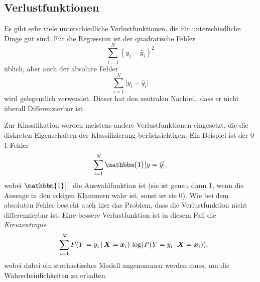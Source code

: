 		\subsection{Verlustfunktionen}
			Es gibt sehr viele unterschiedliche Verlustfunktionen, die für unterschiedliche Dinge gut sind. Für die Regression ist der quadratische Fehler
			\begin{equation}
				\sum_{i = 1}^{N} (y_i - \hat{y}_i)^2
			\end{equation}
			üblich, aber auch der absolute Fehler
			\begin{equation}
				\sum_{i = 1}^{N} \lvert y_i - \hat{y}_i \rvert
			\end{equation}
			wird gelegentlich verwendet. Dieser hat den zentralen Nachteil, dass er nicht überall Differenzierbar ist.

			Zur Klassifikation werden meistens andere Verlustfunktionen eingesetzt, die die diskreten Eigenschaften der Klassifizierung berücksichtigen. Ein Beispiel ist der 0-1-Fehler
			\begin{equation}
				\sum_{i = 1}^{N} \mathbbm{1}[y = \hat{y}],
			\end{equation}
			wobei \( \mathbbm{1}[\cdot] \) die Auswahlfunktion ist (sie ist genau dann \num{1}, wenn die Aussage in den eckigen Klammern wahr ist, sonst ist sie \num{0}). Wie bei dem absoluten Fehler besteht auch hier das Problem, dass die Verlustfunktion nicht differenzierbar ist. Eine bessere Verlustfunktion ist in diesem Fall die \emph{Kreuzentropie}
			\begin{equation}
				-\sum_{i = 1}^{N} P(Y = y_i \,\vert\, \bm{X} = \bm{x}_i) \, \log(P(Y = y_i \,\vert\, \bm{X} = \bm{x}_i)),
			\end{equation}
			wobei dabei ein stochastisches Modell angenommen werden muss, um die Wahrscheinlichkeiten zu erhalten.

